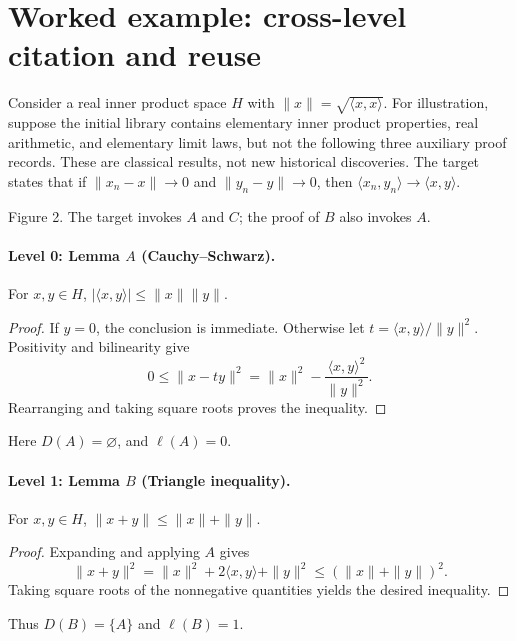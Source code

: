 \documentclass[11pt,a4paper]{article}
\theoremstyle{definition}\newtheorem{definition}{Definition}
\begin{document}
\section{Worked example: cross-level citation and reuse}
Consider a real inner product space $H$ with $\|x\|=\sqrt{\langle x,x\rangle}$. For illustration, suppose the initial library contains elementary inner product properties, real arithmetic, and elementary limit laws, but not the following three auxiliary proof records. These are classical results, not new historical discoveries. The target states that if $\|x_n-x\|\to0$ and $\|y_n-y\|\to0$, then $\langle x_n,y_n\rangle\to\langle x,y\rangle$.

\begin{center}
\par\small Figure 2. The target invokes $A$ and $C$; the proof of $B$ also invokes $A$.
\end{center}

\paragraph{Level 0: Lemma $A$ (Cauchy--Schwarz).} For $x,y\in H$, $|\langle x,y\rangle|\le\|x\|\|y\|$.
\begin{proof}
If $y=0$, the conclusion is immediate. Otherwise let $t=\langle x,y\rangle/\|y\|^2$. Positivity and bilinearity give
\[
 0\le\|x-ty\|^2=\|x\|^2-\frac{\langle x,y\rangle^2}{\|y\|^2}.
\]
Rearranging and taking square roots proves the inequality.
\end{proof}
Here $D(A)=\varnothing$, and $\ell(A)=0$.

\paragraph{Level 1: Lemma $B$ (Triangle inequality).} For $x,y\in H$, $\|x+y\|\le\|x\|+\|y\|$.
\begin{proof}
Expanding and applying $A$ gives
\[
 \|x+y\|^2=\|x\|^2+2\langle x,y\rangle+\|y\|^2
 \le(\|x\|+\|y\|)^2.
\]
Taking square roots of the nonnegative quantities yields the desired inequality.
\end{proof}
Thus $D(B)=\{A\}$ and $\ell(B)=1$.
\end{document}
